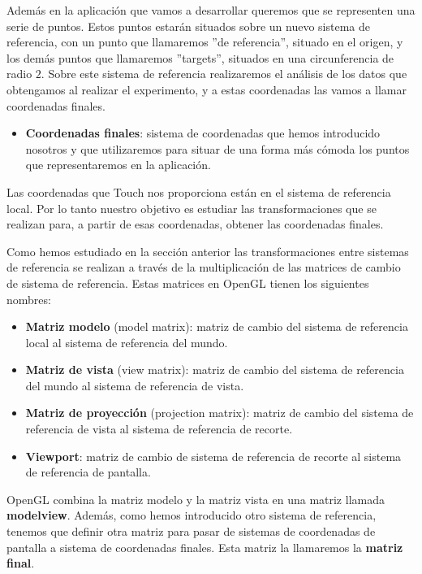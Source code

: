 \documentclass[a4paper,11pt, oneside]{book}
\begin{document}
Además en la aplicación que vamos a desarrollar queremos que se representen una serie de puntos. Estos puntos estarán situados sobre un nuevo sistema de referencia, con un punto que llamaremos ''de referencia'', situado en el origen, y los demás puntos que llamaremos ''targets'', situados en una circunferencia de radio $2$. Sobre este sistema de referencia realizaremos el análisis de los datos que obtengamos al realizar el experimento, y a estas coordenadas las vamos a llamar coordenadas finales.

\begin{itemize}
	\item \textbf{Coordenadas finales}: sistema de coordenadas que hemos introducido nosotros y que utilizaremos para situar de una forma más cómoda los puntos que representaremos en la aplicación.
\end{itemize}



Las coordenadas que Touch nos proporciona están en el sistema de referencia local. Por lo tanto nuestro objetivo es estudiar las transformaciones que se realizan para, a partir de esas coordenadas, obtener las coordenadas finales.

Como hemos estudiado en la sección anterior las transformaciones entre sistemas de referencia se realizan a través de la multiplicación de las matrices de cambio de sistema de referencia. Estas matrices en OpenGL tienen los siguientes nombres:

\begin{itemize}
	\item \textbf{Matriz modelo} (model matrix): matriz de cambio del sistema de referencia local al sistema de referencia del mundo.
	\item \textbf{Matriz de vista} (view matrix): matriz de cambio del sistema de referencia del mundo al sistema de referencia de vista.
	\item \textbf{Matriz de proyección} (projection matrix): matriz de cambio del sistema de referencia de vista al sistema de referencia de recorte.
	\item \textbf{Viewport}: matriz de cambio de sistema de referencia de recorte al sistema de referencia de pantalla.
\end{itemize}

 OpenGL combina la matriz modelo y la matriz vista en una matriz llamada \textbf{modelview}. Además, como hemos introducido otro sistema de referencia, tenemos que definir otra matriz para pasar de sistemas de coordenadas de pantalla a sistema de coordenadas finales. Esta matriz la llamaremos la \textbf{matriz final}.
\end{document}
